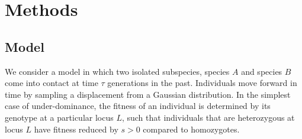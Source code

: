 \documentclass[12pt]{article}
\begin{document}




	
\section{Methods}
\subsection*{Model}
We consider a model in which two isolated subspecies, species $A$ and species $B$ come into contact at time $\tau$ generations in the past. Individuals move forward in time by sampling a displacement from a Gaussian distribution. In the simplest case of under-dominance, the fitness of an individual is determined by its genotype at a particular locus $L$, such that individuals that are heterozygous at locus $L$ have fitness reduced by $s>0$ compared to homozygotes.
\end{document}
